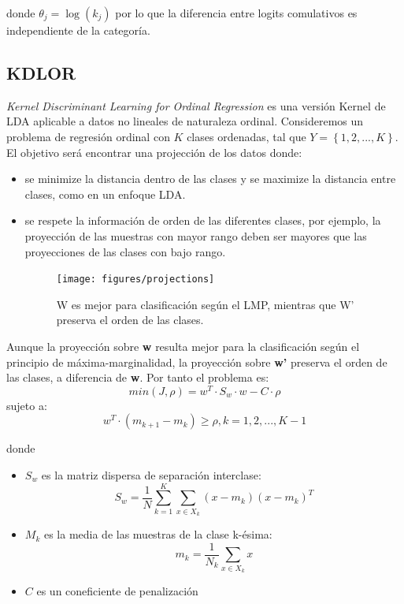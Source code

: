 donde $\theta_j=\log(k_j)$ por lo que la diferencia entre logits comulativos es independiente de la categoría.

\subsection{KDLOR}
\textit{Kernel Discriminant Learning for Ordinal Regression}  \cite{sun2010kernel} es una versión Kernel de LDA aplicable a datos no lineales de naturaleza ordinal. \newline
Consideremos un problema de regresión ordinal con $K$ clases ordenadas, tal que $Y= \left\{ 1,2,...,K \right\}$. El objetivo será encontrar una projección de los datos donde:
\begin{itemize}
	\item se minimize la distancia dentro de las clases y se maximize la distancia entre clases, como en un enfoque LDA.
	\item se respete la información de orden de las diferentes clases, por ejemplo, la proyección de las muestras con mayor rango deben ser mayores que las proyecciones de las clases con bajo rango.
	
	\begin{figure}[H]
		\centering
		\texttt{[image: figures/projections]}
		\caption[Short figure name.]{W es mejor para clasificación según el LMP, mientras que W' preserva el orden de las clases.
			\label{fig:myInlineFigure}}
	\end{figure}
\end{itemize}
	Aunque la proyección sobre \textbf{w} resulta mejor para la clasificación según el principio de máxima-marginalidad, la proyección sobre \textbf{w'} preserva el orden de las clases, a diferencia de \textbf{w}. Por tanto el problema es: 
	$$min(J, \rho)=w^T \cdot S_w \cdot w -C \cdot \rho$$ sujeto a:
	$$w^T \cdot (m_{k+1}-m_k) \geq \rho, k=1,2,...,K-1$$
	
	donde 
	\begin{itemize}
	\item $S_w$ es la matriz dispersa de separación interclase: $$S_w=\frac{1}{N} \sum_{k=1}^{K} \sum_{x \in X_k}(x-m_k)(x-m_k)^T$$
	\item $M_k$ es la media de las muestras de la clase k-ésima:
	$$m_k=\frac{1}{N_k}\sum_{x \in X_k}x$$
	\item $C$ es un coneficiente de penalización
	\end{itemize}


